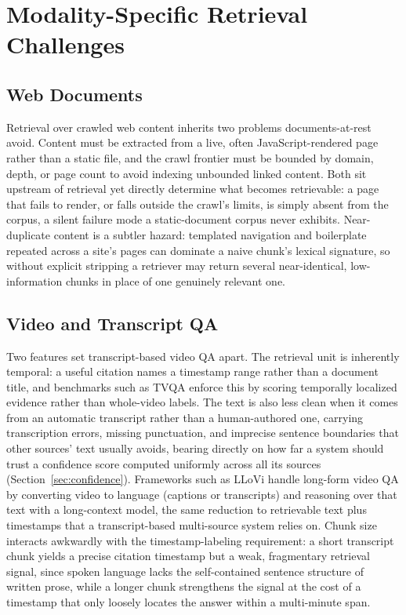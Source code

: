 \documentclass[conference]{IEEEtran}
\begin{document}
\section{Modality-Specific Retrieval Challenges}
\label{sec:modality}

\subsection{Web Documents}
Retrieval over crawled web content inherits two problems documents-at-rest avoid. Content must be extracted from a live, often JavaScript-rendered page rather than a static file, and the crawl frontier must be bounded by domain, depth, or page count to avoid indexing unbounded linked content. Both sit upstream of retrieval yet directly determine what becomes retrievable: a page that fails to render, or falls outside the crawl's limits, is simply absent from the corpus, a silent failure mode a static-document corpus never exhibits. Near-duplicate content is a subtler hazard: templated navigation and boilerplate repeated across a site's pages can dominate a naive chunk's lexical signature, so without explicit stripping a retriever may return several near-identical, low-information chunks in place of one genuinely relevant one.

\subsection{Video and Transcript QA}
Two features set transcript-based video QA apart. The retrieval unit is inherently temporal: a useful citation names a timestamp range rather than a document title, and benchmarks such as TVQA \cite{lei2018tvqa} enforce this by scoring temporally localized evidence rather than whole-video labels. The text is also less clean when it comes from an automatic transcript rather than a human-authored one, carrying transcription errors, missing punctuation, and imprecise sentence boundaries that other sources' text usually avoids, bearing directly on how far a system should trust a confidence score computed uniformly across all its sources (Section~\ref{sec:confidence}). Frameworks such as LLoVi \cite{zhang2024llovi} handle long-form video QA by converting video to language (captions or transcripts) and reasoning over that text with a long-context model, the same reduction to retrievable text plus timestamps that a transcript-based multi-source system relies on. Chunk size interacts awkwardly with the timestamp-labeling requirement: a short transcript chunk yields a precise citation timestamp but a weak, fragmentary retrieval signal, since spoken language lacks the self-contained sentence structure of written prose, while a longer chunk strengthens the signal at the cost of a timestamp that only loosely locates the answer within a multi-minute span.
\end{document}
